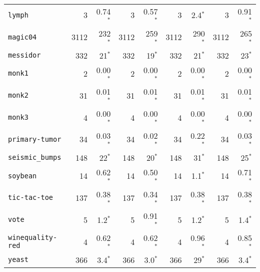 \begin{tabular}{lrrrrrrrr}
\texttt{lymph} & 3 & 0.74$^*$ & 3 & 0.57$^*$ & 3 & 2.4$^*$ & 3 & 0.91$^*$\\
\texttt{magic04} & 3112 & 232$^*$ & 3112 & 259$^*$ & 3112 & 290$^*$ & 3112 & 265$^*$\\
\texttt{messidor} & 332 & 21$^*$ & 332 & 19$^*$ & 332 & 21$^*$ & 332 & 23$^*$\\
\texttt{monk1} & 2 & 0.00$^*$ & 2 & 0.00$^*$ & 2 & 0.00$^*$ & 2 & 0.00$^*$\\
\texttt{monk2} & 31 & 0.01$^*$ & 31 & 0.01$^*$ & 31 & 0.01$^*$ & 31 & 0.01$^*$\\
\texttt{monk3} & 4 & 0.00$^*$ & 4 & 0.00$^*$ & 4 & 0.00$^*$ & 4 & 0.00$^*$\\
\texttt{primary-tumor} & 34 & 0.03$^*$ & 34 & 0.02$^*$ & 34 & 0.22$^*$ & 34 & 0.03$^*$\\
\texttt{seismic\_bumps} & 148 & 22$^*$ & 148 & 20$^*$ & 148 & 31$^*$ & 148 & 25$^*$\\
\texttt{soybean} & 14 & 0.62$^*$ & 14 & 0.50$^*$ & 14 & 1.1$^*$ & 14 & 0.71$^*$\\
\texttt{tic-tac-toe} & 137 & 0.38$^*$ & 137 & 0.34$^*$ & 137 & 0.38$^*$ & 137 & 0.38$^*$\\
\texttt{vote} & 5 & 1.2$^*$ & 5 & 0.91$^*$ & 5 & 1.2$^*$ & 5 & 1.4$^*$\\
\texttt{winequality-red} & 4 & 0.62$^*$ & 4 & 0.62$^*$ & 4 & 0.96$^*$ & 4 & 0.85$^*$\\
\texttt{yeast} & 366 & 3.4$^*$ & 366 & 3.0$^*$ & 366 & 29$^*$ & 366 & 3.4$^*$\\
\bottomrule
\end{tabular}
